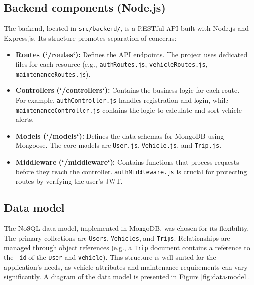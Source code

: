 \subsection{Backend components (Node.js)}
The backend, located in \texttt{src/backend/}, is a RESTful API built with Node.js and Express.js. Its structure promotes separation of concerns:
\begin{itemize}
    \item \textbf{Routes (`/routes`):} Defines the API endpoints. The project uses dedicated files for each resource (e.g., \texttt{authRoutes.js}, \texttt{vehicleRoutes.js}, \texttt{maintenanceRoutes.js}).
    \item \textbf{Controllers (`/controllers`):} Contains the business logic for each route. For example, \texttt{authController.js} handles registration and login, while \texttt{maintenanceController.js} contains the logic to calculate and sort vehicle alerts.
    \item \textbf{Models (`/models`):} Defines the data schemas for MongoDB using Mongoose. The core models are \texttt{User.js}, \texttt{Vehicle.js}, and \texttt{Trip.js}.
    \item \textbf{Middleware (`/middleware`):} Contains functions that process requests before they reach the controller. \texttt{authMiddleware.js} is crucial for protecting routes by verifying the user's JWT.
\end{itemize}

\subsection{Data model}
The NoSQL data model, implemented in MongoDB, was chosen for its flexibility. The primary collections are \texttt{Users}, \texttt{Vehicles}, and \texttt{Trips}. Relationships are managed through object references (e.g., a \texttt{Trip} document contains a reference to the \texttt{\_id} of the \texttt{User} and \texttt{Vehicle}). This structure is well-suited for the application's needs, as vehicle attributes and maintenance requirements can vary significantly. A diagram of the data model is presented in Figure \ref{fig:data-model}.

